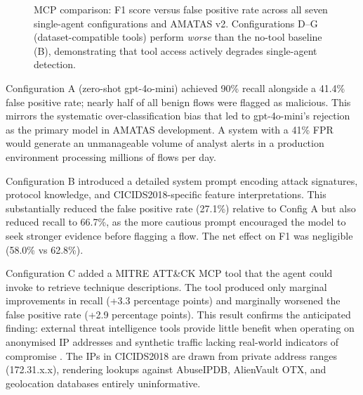 \documentclass[../main.tex]{subfiles}
\begin{document}
\begin{figure}[H]
\caption{MCP comparison: F1 score versus false positive rate across all seven single-agent configurations and AMATAS v2. Configurations D--G (dataset-compatible tools) perform \textit{worse} than the no-tool baseline (B), demonstrating that tool access actively degrades single-agent detection.}
\label{fig:mcp-comparison}
\end{figure}

Configuration A (zero-shot gpt-4o-mini) achieved 90\% recall alongside a 41.4\% false positive rate; nearly half of all benign flows were flagged as malicious. This mirrors the systematic over-classification bias that led to gpt-4o-mini's rejection as the primary model in AMATAS development. A system with a 41\% FPR would generate an unmanageable volume of analyst alerts in a production environment processing millions of flows per day.

Configuration B introduced a detailed system prompt encoding attack signatures, protocol knowledge, and CICIDS2018-specific feature interpretations. This substantially reduced the false positive rate (27.1\%) relative to Config A but also reduced recall to 66.7\%, as the more cautious prompt encouraged the model to seek stronger evidence before flagging a flow. The net effect on F1 was negligible (58.0\% vs 62.8\%).

Configuration C added a MITRE ATT\&CK MCP tool that the agent could invoke to retrieve technique descriptions. The tool produced only marginal improvements in recall (+3.3 percentage points) and marginally worsened the false positive rate (+2.9 percentage points). This result confirms the anticipated finding: external threat intelligence tools provide little benefit when operating on anonymised IP addresses and synthetic traffic lacking real-world indicators of compromise \autocite{Mukherjee2023}. The IPs in CICIDS2018 are drawn from private address ranges (172.31.x.x), rendering lookups against AbuseIPDB, AlienVault OTX, and geolocation databases entirely uninformative.
\end{document}
